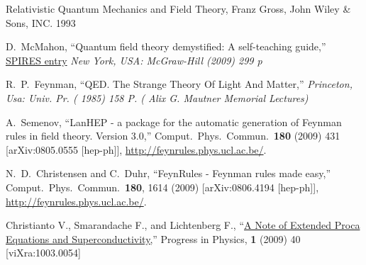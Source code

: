 \begin{thebibliography}{99}
Relativistic Quantum Mechanics and Field Theory, Franz Gross, John Wiley \& Sons, INC. 1993

  D.~McMahon,
  ``Quantum field theory demystified: A self-teaching guide,''
  \href{http://www.slac.stanford.edu/spires/find/hep/www?irn=8432112}{SPIRES entry}
{\it  New York, USA: McGraw-Hill (2009) 299 p}

  R.~P.~Feynman,
  ``QED. The Strange Theory Of Light And Matter,''
{\it  Princeton, Usa: Univ. Pr. ( 1985) 158 P. ( Alix G. Mautner Memorial Lectures)}


  A.~Semenov,
  ``LanHEP - a package for the automatic generation of Feynman rules in field
  theory. Version 3.0,''
  Comput.\ Phys.\ Commun.\  {\bf 180} (2009) 431
  [arXiv:0805.0555 [hep-ph]], \url{http://feynrules.phys.ucl.ac.be/}.

  N.~D.~Christensen and C.~Duhr,
  ``FeynRules - Feynman rules made easy,''
  Comput.\ Phys.\ Commun.\  {\bf 180}, 1614 (2009)
  [arXiv:0806.4194 [hep-ph]],
   \url{http://feynrules.phys.ucl.ac.be/}.

  Christianto V., Smarandache F., and Lichtenberg F., 
  ``\href{http://www.ptep-online.com/index_files/2009/PP-16-08.PDF}{A Note of Extended Proca Equations and Superconductivity,}''
  Progress in Physics, \textbf{1} (2009) 40
  [viXra:1003.0054]

\end{thebibliography}
